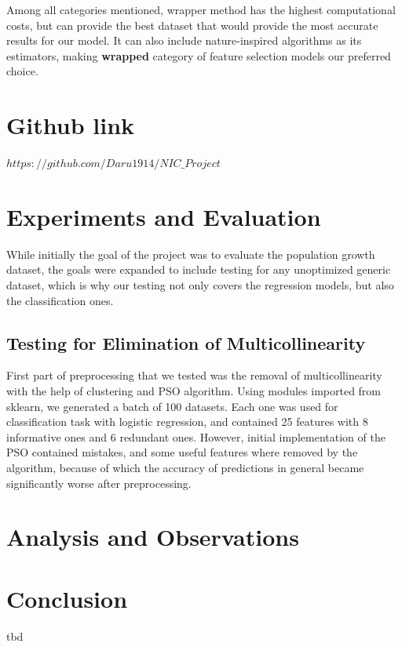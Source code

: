 \documentclass[conference]{IEEEtran}
\begin{document}
Among all categories mentioned, wrapper method has the highest computational costs, but can provide the best dataset that would provide the most accurate results for our model. It can also include nature-inspired algorithms as its estimators, making \textbf{wrapped} category of feature selection models our preferred choice. 

\section{Github link}
$https://github.com/Daru1914/NIC\_Project$

\section{Experiments and Evaluation}

While initially the goal of the project was to evaluate the population growth dataset, the goals were expanded to include testing for any unoptimized generic dataset, which is why our testing not only covers the regression models, but also the classification ones.

\subsection{Testing for Elimination of Multicollinearity}

First part of preprocessing that we tested was the removal of multicollinearity with the help of clustering and PSO algorithm. Using modules imported from sklearn, we generated a batch of 100 datasets. Each one was used for classification task with logistic regression, and contained 25 features with 8 informative ones and 6 redundant ones. However, initial implementation of the PSO contained mistakes, and some useful features where removed by the algorithm, because of which the accuracy of predictions in general became significantly worse after preprocessing.

\section{Analysis and Observations}



\section{Conclusion}
tbd



\end{document}

